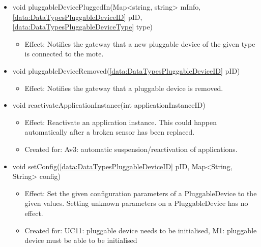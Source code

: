 \begin{description}
\begin{itemize}[noitemsep,nolistsep,leftmargin=-.25cm]
\begin{itemize}
        \end{itemize}
      \item \textsf{void pluggableDevicePluggedIn(Map\textless{}string, string\textgreater{} mInfo, \ref{data:DataTypesPluggableDeviceID} pID, \ref{data:DataTypesPluggableDeviceType} type)}
        \begin{itemize}[noitemsep,nolistsep]
           \item Effect: Notifies the gateway that a new pluggable device of the given type is connected to the mote.
        \end{itemize}
      \item \textsf{void pluggableDeviceRemoved(\ref{data:DataTypesPluggableDeviceID} pID)}
        \begin{itemize}[noitemsep,nolistsep]
           \item Effect: Notifies the gateway that a pluggable device is removed.
        \end{itemize}
      \item \textsf{void reactivateApplicationInstance(int applicationInstanceID)}
        \begin{itemize}[noitemsep,nolistsep]
           \item Effect: Reactivate an application instance. This could happen automatically after a broken sensor has been replaced.
\item Created for: Av3: automatic suspension/reactivation of applications.
        \end{itemize}
      \item \textsf{void setConfig(\ref{data:DataTypesPluggableDeviceID} pID, Map\textless{}String, String\textgreater{} config)}
        \begin{itemize}[noitemsep,nolistsep]
           \item Effect: Set the given configuration parameters of a PluggableDevice to the given values. Setting unknown parameters on a PluggableDevice has no effect. \\
\item Created for: UC11: pluggable device needs to be initialised, M1: pluggable device must be able to be initialised
        \end{itemize}
    \end{itemize}
    \end{description}

